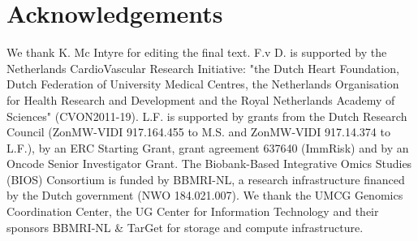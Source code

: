 \section*{Acknowledgements}
We thank K. Mc Intyre for editing the final text. F.v D. is supported by the Netherlands CardioVascular Research Initiative: "the Dutch Heart Foundation, Dutch Federation of University Medical Centres, the Netherlands Organisation for Health Research and Development and the Royal Netherlands Academy of Sciences" (CVON2011-19). L.F. is supported by grants from the Dutch Research Council (ZonMW-VIDI 917.164.455 to M.S. and ZonMW-VIDI 917.14.374 to L.F.), by an ERC Starting Grant, grant agreement 637640 (ImmRisk) and by an Oncode Senior Investigator Grant. The Biobank-Based Integrative Omics Studies (BIOS) Consortium is funded by BBMRI-NL, a research infrastructure financed by the Dutch government (NWO 184.021.007). We thank the UMCG Genomics Coordination Center, the UG Center for Information Technology and their sponsors BBMRI-NL \& TarGet for storage and compute infrastructure.




